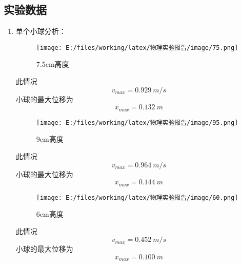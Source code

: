 \documentclass[UTF8]{article}
\begin{document}
        \subsection{实验数据}
            \begin{enumerate}[left=2em, label=\arabic*.]
                \item 单个小球分析：
                    \begin{figure}[H]
                        \centering
                        \texttt{[image: E:/files/working/latex/物理实验报告/image/75.png]}
                        \caption{7.5cm高度}
                        \label{fig:7.5cm}
                    \end{figure}

                    此情况
                    $${v}_{max}=\SI{0.929}{m/s}$$
                    小球的最大位移为
                    $$x_{max}=\SI{0.132}{m}$$

                    \begin{figure}[H]
                        \centering
                        \texttt{[image: E:/files/working/latex/物理实验报告/image/95.png]}
                        \caption{9cm高度}
                        \label{fig:9.5cm}
                    \end{figure}


                    此情况
                    $${v}_{max}=\SI{0.964}{m/s}$$
                    小球的最大位移为
                    $$x_{max}=\SI{0.144}{m}$$

                    \begin{figure}[H]
                        \centering
                        \texttt{[image: E:/files/working/latex/物理实验报告/image/60.png]}
                        \caption{6cm高度}
                        \label{fig:6cm}
                    \end{figure}
    
                    此情况
                    $${v}_{max}=\SI{0.452}{m/s}$$
                    小球的最大位移为
                    $$x_{max}=\SI{0.100}{m}$$


\end{enumerate}
\end{document}

